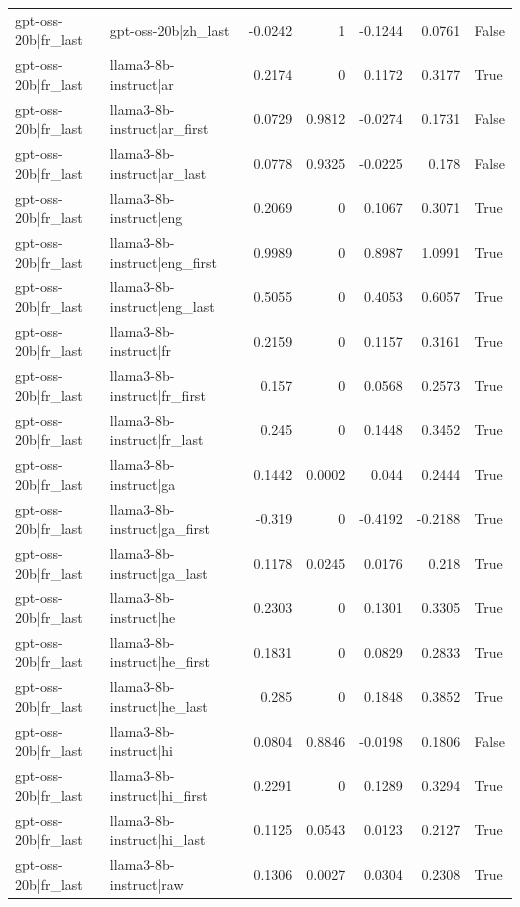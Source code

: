 \begin{table}
\begin{tabular}{l l r r r r l}
gpt-oss-20b|fr_last & gpt-oss-20b|zh_last & -0.0242 & 1 & -0.1244 & 0.0761 & False \\
gpt-oss-20b|fr_last & llama3-8b-instruct|ar & 0.2174 & 0 & 0.1172 & 0.3177 & True \\
gpt-oss-20b|fr_last & llama3-8b-instruct|ar_first & 0.0729 & 0.9812 & -0.0274 & 0.1731 & False \\
gpt-oss-20b|fr_last & llama3-8b-instruct|ar_last & 0.0778 & 0.9325 & -0.0225 & 0.178 & False \\
gpt-oss-20b|fr_last & llama3-8b-instruct|eng & 0.2069 & 0 & 0.1067 & 0.3071 & True \\
gpt-oss-20b|fr_last & llama3-8b-instruct|eng_first & 0.9989 & 0 & 0.8987 & 1.0991 & True \\
gpt-oss-20b|fr_last & llama3-8b-instruct|eng_last & 0.5055 & 0 & 0.4053 & 0.6057 & True \\
gpt-oss-20b|fr_last & llama3-8b-instruct|fr & 0.2159 & 0 & 0.1157 & 0.3161 & True \\
gpt-oss-20b|fr_last & llama3-8b-instruct|fr_first & 0.157 & 0 & 0.0568 & 0.2573 & True \\
gpt-oss-20b|fr_last & llama3-8b-instruct|fr_last & 0.245 & 0 & 0.1448 & 0.3452 & True \\
gpt-oss-20b|fr_last & llama3-8b-instruct|ga & 0.1442 & 0.0002 & 0.044 & 0.2444 & True \\
gpt-oss-20b|fr_last & llama3-8b-instruct|ga_first & -0.319 & 0 & -0.4192 & -0.2188 & True \\
gpt-oss-20b|fr_last & llama3-8b-instruct|ga_last & 0.1178 & 0.0245 & 0.0176 & 0.218 & True \\
gpt-oss-20b|fr_last & llama3-8b-instruct|he & 0.2303 & 0 & 0.1301 & 0.3305 & True \\
gpt-oss-20b|fr_last & llama3-8b-instruct|he_first & 0.1831 & 0 & 0.0829 & 0.2833 & True \\
gpt-oss-20b|fr_last & llama3-8b-instruct|he_last & 0.285 & 0 & 0.1848 & 0.3852 & True \\
gpt-oss-20b|fr_last & llama3-8b-instruct|hi & 0.0804 & 0.8846 & -0.0198 & 0.1806 & False \\
gpt-oss-20b|fr_last & llama3-8b-instruct|hi_first & 0.2291 & 0 & 0.1289 & 0.3294 & True \\
gpt-oss-20b|fr_last & llama3-8b-instruct|hi_last & 0.1125 & 0.0543 & 0.0123 & 0.2127 & True \\
gpt-oss-20b|fr_last & llama3-8b-instruct|raw & 0.1306 & 0.0027 & 0.0304 & 0.2308 & True \\

\end{tabular}
\end{table}
